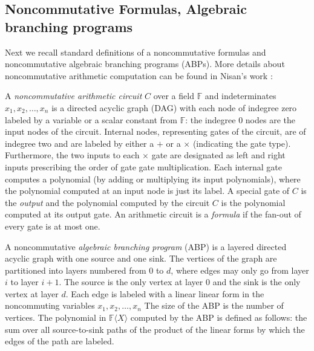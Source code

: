 \documentclass[10pt,a4paper]{article}
\newcommand{\F}{\mathbb{F}}
\renewcommand{\angle}[1]{\langle #1 \rangle}
\begin{document}
\subsection*{Noncommutative Formulas, Algebraic branching programs} 

Next we recall standard definitions of a noncommutative formulas and
noncommutative algebraic branching programs (ABPs). More details about
noncommutative arithmetic computation can be found in Nisan's work
\cite{N91}:
  
A \emph{noncommutative arithmetic circuit} $C$ over a field $\F$ and
indeterminates $x_1,x_2,\ldots,x_n$ is a directed acyclic graph (DAG)
with each node of indegree zero labeled by a variable or a scalar
constant from $\F$: the indegree $0$ nodes are the input nodes of the
circuit. Internal nodes, representing gates of the circuit, are of
indegree two and are labeled by either a $+$ or a $\times$ (indicating
the gate type). Furthermore, the two inputs to each $\times$ gate are
designated as left and right inputs prescribing the order of gate gate
multiplication. Each internal gate computes a polynomial (by adding or
multiplying its input polynomials), where the polynomial computed at
an input node is just its label.  A special gate of $C$ is the
\emph{output} and the polynomial computed by the circuit $C$ is the
polynomial computed at its output gate. An arithmetic circuit is a
\emph{formula} if the fan-out of every gate is at most one.\smallskip

A noncommutative \emph{algebraic branching program} (ABP) is a layered
directed acyclic graph with one source and one sink. The vertices of
the graph are partitioned into layers numbered from $0$ to $d$, where
edges may only go from layer $i$ to layer $i+1$. The source is the
only vertex at layer $0$ and the sink is the only vertex at layer
$d$. Each edge is labeled with a linear linear form in the
noncommuting variables $x_1, x_2, \ldots, x_n$ The size of the ABP is
the number of vertices. The polynomial in $\F\angle{X}$ computed by
the ABP is defined as follows: the sum over all source-to-sink paths
of the product of the linear forms by which the edges of the path are
labeled.

%
%

\end{document}
